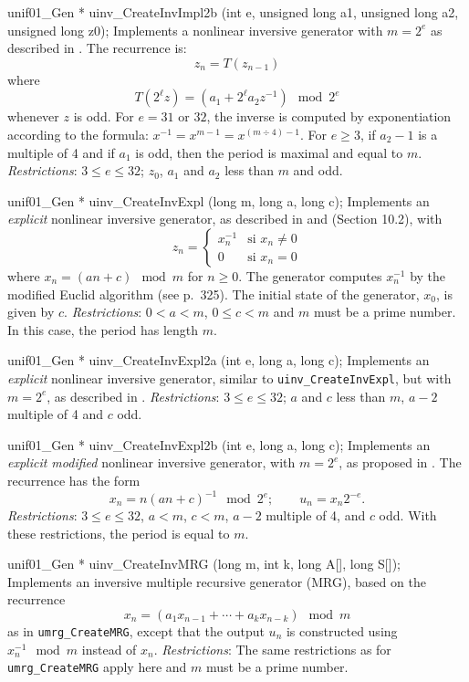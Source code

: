 unif01_Gen * uinv_CreateInvImpl2b (int e, unsigned long a1,
                                   unsigned long a2, unsigned long z0);
\endcode
  \tab Implements a nonlinear inversive generator with $m = 2^e$
   as described in \cite{rEIC92d}.
   The recurrence is:
     $$ z_n = T(z_{n-1}) $$
   where
     $$ T(2^\ell z) = (a_1 + 2^\ell a_2 z^{-1}) \mod 2^e $$
   whenever $z$ is odd.
   For $e = 31$ or $32$, the inverse is computed by exponentiation
   according to the formula:
   $x^{-1} = x^{m-1} = x^{(m \div 4) - 1}$.
   For $e\ge 3$, if $a_2-1$ is a multiple of 4 and if $a_1$ is odd,
   then the period is maximal and equal to $m$.
   \emph{Restrictions}:  $3 \le e \le 32$; $z_0$, $a_1$ and $a_2$ less than
   $m$ and odd.
  \endtab
\code


unif01_Gen * uinv_CreateInvExpl (long m, long a, long c);
\endcode
  \tab Implements an  {\em explicit\/} nonlinear inversive generator,
   as described in \cite{rEIC93a} and
   \cite{rLEC94a} (Section 10.2), with
    \[ z_n = \left\{
     \begin{array}{ll}
       x_n^{-1} & \mbox{si $x_n\not=0$}\\[6pt]
       0        & \mbox{si $x_n = 0$}
     \end{array} \right. \]
   where $x_n = (an+c) \mod m$ for $n \ge 0$.
   The generator computes
   $x_n^{-1}$ by the modified Euclid algorithm (see \cite{rKNU81a}
   p.~325). The initial state of the generator, $x_0$, is given by
   $c$.  \emph{Restrictions}: $0 < a < m$, $0 \le c < m$ and $m$ must be a prime
   number.  In this case, the period has length $m$.
  \endtab
\code


unif01_Gen * uinv_CreateInvExpl2a (int e, long a, long c);
\endcode
  \tab Implements  an  {\em explicit\/} nonlinear inversive generator,
  similar to {\tt uinv\_CreateInvExpl}, but with
   $m = 2^e$, as described in \cite{rEIC94b}.
   \emph{Restrictions}:  $3 \le e \le 32$; $a$ and $c$ less than $m$,
   $a-2$ multiple of 4 and $c$ odd.
  \endtab
\code


unif01_Gen * uinv_CreateInvExpl2b (int e, long a, long c);
\endcode
  \tab Implements an  {\em explicit modified\/}
   nonlinear inversive generator, with $m = 2^e$, as proposed
   in \cite{rEIC95d}.   The recurrence has the form
    $$ x_n = n(an + c)^{-1} \mod 2^e; \qquad u_n = x_n 2^{-e}. $$
   \emph{Restrictions}:  $3 \le e \le 32$, $a < m$, $c < m$,
   $a-2$ multiple of 4, and $c$ odd.
   With these restrictions, the period is equal to $m$.
  \endtab
\code


unif01_Gen * uinv_CreateInvMRG (long m, int k, long A[], long S[]);
\endcode
  \tab  Implements an inversive multiple recursive generator (MRG),
   based on the recurrence
    $$ x_n = (a_1 x_{n-1} + \cdots + a_k x_{n-k}) \mod m $$
   as in {\tt umrg\_CreateMRG}, except that the output $u_n$ is
   constructed using $x_n^{-1} \mod m$ instead of $x_n$.
   \emph{Restrictions}: The same restrictions as for {\tt umrg\_CreateMRG}
   apply here and $m$ must be a prime number.
  \endtab
\code


